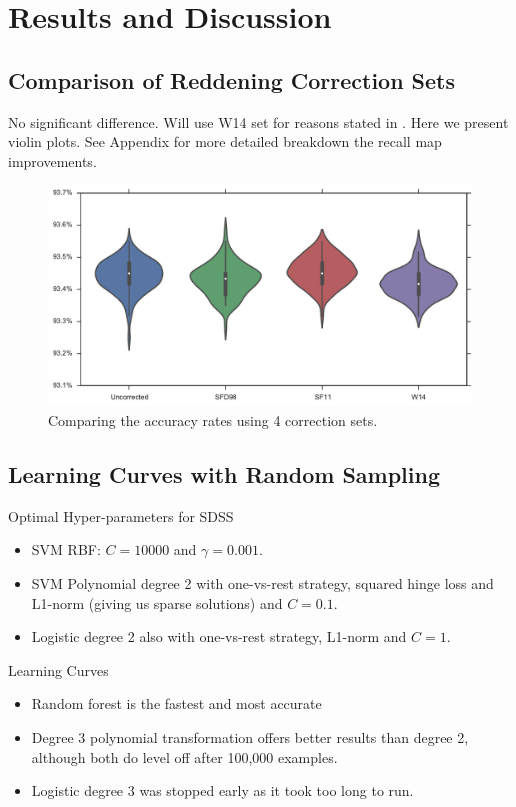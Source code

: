 \section{Results and Discussion}
\label{sec:results1}

\subsection{Comparison of Reddening Correction Sets}
No significant difference. Will use W14 set for reasons stated in \cite{wolf14}.
Here we present violin plots. See Appendix for more detailed breakdown
the recall map improvements. 


\begin{figure}[tbp]
	\centering
	\includegraphics[width=\textwidth]{figures/4_expt1/violin_reddening_correction}
	\caption[Accuracy rates with four reddening correction sets]{Comparing the
		accuracy rates using 4 correction sets.}
	\label{fig:reddeningviolin}
\end{figure}

\subsection{Learning Curves with Random Sampling}
Optimal Hyper-parameters for SDSS
\begin{itemize}
	\item SVM RBF: $C = 10 000$ and $\gamma = 0.001$.
	\item SVM Polynomial degree 2 with one-vs-rest strategy, squared hinge loss and L1-norm
	(giving us sparse solutions) and $C = 0.1$.
	\item Logistic degree 2 also with one-vs-rest strategy, L1-norm and $C=1$.
\end{itemize}
Learning Curves
\begin{itemize}
	\item Random forest is the fastest and most accurate
	\item Degree 3 polynomial transformation offers better results than degree 2, although
	both do level off after 100,000 examples.
	\item Logistic degree 3 was stopped early as it took too long to run.
\end{itemize}



